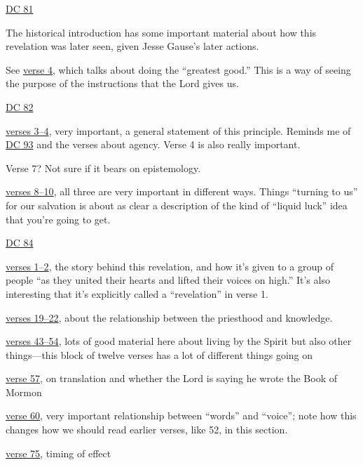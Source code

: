 \begin{compactdesc}
			\item \hyperref[DC81]{DC 81}
				\begin{compactitem}
					\item The historical introduction has some important material about how this revelation was later seen, given Jesse Gause's later actions.
					\item See \hyperref[DC81-4]{verse 4}, which talks about doing the ``greatest good.'' This is a way of seeing the purpose of the instructions that the Lord gives us.
				\end{compactitem} 
			\item \hyperref[DC82]{DC 82}
				\begin{compactitem}
					\item \hyperref[DC82-3]{verses 3--4}, very important, a general statement of this principle. Reminds me of \hyperref[DC93]{DC 93} and the verses about agency. Verse 4 is also really important.
					\item Verse 7? Not sure if it bears on epistemology.
					\item \hyperref[DC82-8]{verses 8--10}, all three are very important in different ways. Things ``turning to us'' for our salvation is about as clear a description of the kind of ``liquid luck'' idea that you're going to get.
				\end{compactitem}
			\item \hyperref[DC84]{DC 84}
				\begin{compactitem}
					\item \hyperref[DC84-1]{verses 1--2}, the story behind this revelation, and how it's given to a group of people ``as they united their hearts and lifted their voices on high.'' It's also interesting that it's explicitly called a ``revelation'' in verse 1.
					\item \hyperref[DC84-19]{verses 19--22}, about the relationship between the priesthood and knowledge.
					\item \hyperref[DC84-43]{verses 43--54}, lots of good material here about living by the Spirit but also other things---this block of twelve verses has a lot of different things going on
					\item \hyperref[DC84-57]{verse 57}, on translation and whether the Lord is saying he wrote the Book of Mormon
					\item \hyperref[DC84-60]{verse 60}, very important relationship between ``words'' and ``voice''; note how this changes how we should read earlier verses, like 52, in this section.
					\item \hyperref[DC84-75]{verse 75}, timing of effect

\end{compactitem}
\end{compactdesc}
